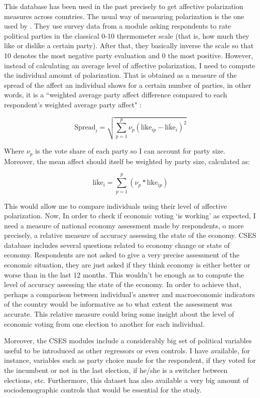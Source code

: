 \documentclass[a4paper, svgnames]{article}
\begin{document}
This database has been used in the past precisely to get affective polarization measures across countries. The usual way of measuring polarization is the one used by \cite{Gidron2018}. They use survey data from a module asking respondents to rate political parties in the classical 0-10 thermometer scale (that is, how much they like or dislike a certain party). After that, they basically inverse the scale so that 10 denotes the most negative party evaluation and 0 the most positive. However, instead of calculating an average level of affective polarization, I need to compute the individual amount of polarization. That is obtained as a measure of the spread of the affect an individual shows for a certain number of parties, in other words, it is a ``weighted average party affect difference compared to each respondent's weighted average party affect" \citep{Wagner2021}:

$$
	\text{Spread}_i = \sqrt{\sum^p_{p=1}\nu_p(\text{like}_{ip}-\overline{\text{like}}_i)^2}
$$

Where $\nu_p$ is the vote share of each party so I can account for party size. Moreover, the mean affect should itself be weighted by party size, calculated as:

$$
	\overline{\text{like}}_i = \sum^p_{p=1} (\nu_p * \text{like}_{ip})
$$

This would allow me to compare individuals using their level of affective polarization. Now, In order to check if economic voting `is working' as expected, I need a measure of national economy assessment made by respondents, o more precisely, a relative measure of accuracy assessing the state of the economy. CSES database includes several questions related to economy change or state of economy. Respondents are not asked to give a very precise assessment of the economic situation, they are just asked if they think economy is either better or worse than in the last 12 months. This wouldn't be enough as to compute the level of accuracy assessing the state of the economy. In order to achieve that, perhaps a comparison between individual's answer and macroeconomic indicators of the country would be informative as to what extent the assessment was accurate. This relative measure could bring some insight about the level of economic voting from one election to another for each individual.

Moreover, the CSES modules include a considerably big set of political variables useful to be introduced as other regressors or even controls. I have available, for instance, variables such as party choice made for the respondent, if they voted for the incumbent or not in the last election, if he/she is a switcher between elections, etc. Furthermore, this dataset has also available a very big amount of sociodemographic controls that would be essential for the study.
\end{document}
